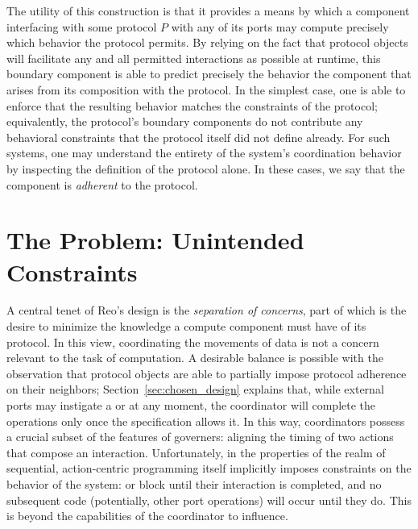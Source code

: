 The utility of this construction is that it provides a means by which a component interfacing with some protocol $P$ with any of its ports may compute precisely which behavior the protocol permits. By relying on the fact that protocol objects will facilitate any and all permitted interactions as possible at runtime, this boundary component is able to predict precisely the behavior the component that arises from its composition with the protocol. In the simplest case, one is able to enforce that the resulting behavior matches the constraints of the protocol; equivalently, the protocol's boundary components do not contribute any behavioral constraints that the protocol itself did not define already. For such systems, one may understand the entirety of the system's coordination behavior by inspecting the definition of the protocol alone. In these cases, we say that the component is \textit{adherent} to the protocol.

\section{The Problem: Unintended Constraints}
\label{sec:unintended_constraints}
A central tenet of Reo's design is the \textit{separation of concerns}, part of which is the desire to minimize the knowledge a compute component must have of its protocol. In this view, coordinating the movements of data is not a concern relevant to the task of computation. A desirable balance is possible with the observation that protocol objects are able to partially impose protocol adherence on their neighbors; Section~\ref{sec:chosen_design} explains that, while external ports may instigate a  or  at any moment, the coordinator will complete the operations only once the specification allows it. In this way, coordinators possess a crucial subset of the features of governers: aligning the timing of two actions that compose an interaction. Unfortunately, in the properties of the realm of sequential, action-centric programming itself implicitly imposes constraints on the behavior of the system:  or  block until their interaction is completed, and no subsequent code (potentially, other port operations) will occur until they do. This is beyond the capabilities of the coordinator to influence.

